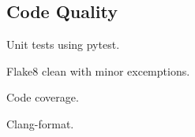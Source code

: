 \subsection{Code Quality}

Unit tests using pytest.

Flake8 clean with minor excemptions.\label{sec:flake8}

Code coverage.

Clang-format.
